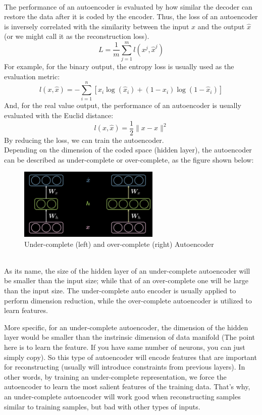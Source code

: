 \\
The performance of an autoencoder is evaluated by how similar the decoder can restore the data after it is coded by the encoder. Thus, the loss of an autoencoder is inversely correlated with the similarity between the input $x$ and the output $\hat{x}$ (or we might call it as the reconstruction loss). 
$$ L=\frac{1}{m}\sum_{j=1}^m l(x^j,\hat{x}^j) $$
For example, for the binary output, the entropy loss is usually used as the evaluation metric:
$$ l(x,\hat{x}) = -\sum_{i=1}^n[x_i\log(\hat{x}_i) + (1-x_i)\log(1-\hat{x}_i) ]$$
And, for the real value output, the performance of an autoencoder is usually evaluated with the Euclid distance:
$$ l(x,\hat{x}) = \frac{1}{2} \| x-\hat{x} \|^2 $$
By reducing the loss, we can train the autoencoder.
\\
Depending on the dimension of the coded space (hidden layer), the autoencoder can be described as under-complete or over-complete, as the figure shown below:
\\
\begin{figure}[htb]
    \centering
    \includegraphics[width=0.6\textwidth]{labs/09/images/Under_(over)_complete_Autoencoder.png}
    \caption{Under-complete (left) and over-complete (right) Autoencoder}
    \label{fig:Under_(over)_complete_Autoencoder}
\end{figure}
\\
As its name, the size of the hidden layer of an under-complete autoencoder will be smaller than the input size; while that of an over-complete one will be large than the input size. The under-complete auto encoder is usually applied to perform dimension reduction, while the over-complete autoencoder is utilized to learn features.

More specific, for an under-complete autoencoder, the dimension of the hidden layer would be smaller than the instrinsic dimension of data manifold (The point here is to learn the feature. If you have same number of neurons, you can just simply copy). So this type of autoencoder will encode features that are important for reconstructing (usually will introduce constraints from previous layers). In other words, by training an under-complete representation, we force the autoencoder to learn the most salient features of the training data. That's why, an under-complete autoencoder will work good when reconstructing samples similar to training samples, but bad with other types of inputs.  

